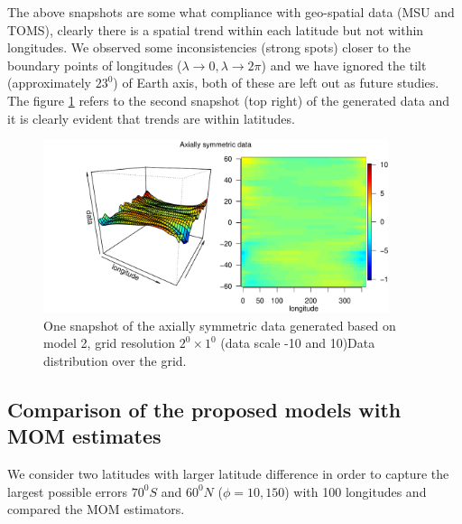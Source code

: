 The above snapshots are some what compliance with geo-spatial data (MSU and TOMS), clearly there is a spatial trend within each latitude but not within longitudes. We observed some inconsistencies (strong spots) closer to the boundary points of longitudes ($\lambda \rightarrow 0,\lambda \rightarrow 2\pi$) and we have ignored the tilt (approximately $23^0$) of Earth axis, both of these are left out as future studies. The figure \ref{grid_plot_model2_sim2} refers to the second snapshot (top right) of the generated data and it is clearly evident that trends are within latitudes.     

\begin{figure}[H]
	\label{grid_plot_model2_sim2}
	\begin{center}
		\includegraphics [width=0.9\textwidth ]{graphs/Data_sample_120_model2_density.pdf}
		\caption{One snapshot of the axially symmetric data generated based on model 2, grid resolution $2^0\times 1^0$ (data scale -10 and 10)Data distribution over the grid.}
	\end{center}
\end{figure}

\subsection{Comparison of the proposed models with MOM estimates}

We consider two latitudes with larger latitude difference in order to capture the largest possible errors $70^0S$ and $60^0N$ ($\phi = 10, 150$) with 100 longitudes and compared the MOM estimators.

